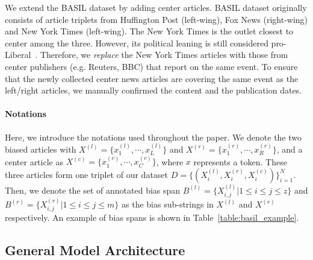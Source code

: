 \documentclass[11pt,a4paper]{article}
\begin{document}
We extend the BASIL dataset by adding center articles.
BASIL dataset originally consists of article triplets from Huffington Post (left-wing), Fox News (right-wing) and New York Times (left-wing). 
The New York Times is the outlet closest to center among the three. However, its political leaning is still considered pro-Liberal~\cite{puglisi2011being, chiang2011media}. Therefore, we \textit{replace} the New York Times articles with those from center publishers (e.g. Reuters, BBC) that report on the same event. To ensure that the newly collected center news articles are covering the same event as the left/right articles, we manually confirmed the content and the publication dates.

\paragraph{Notations} Here, we introduce the notations used throughout the paper. We denote the two biased articles with $X^{(l)}=\{x^{(l)}_1, \cdots, x^{(l)}_L\}$ and $X^{(r)}=\{x^{(r)}_1, \cdots, x^{(r)}_R\}$, and a center article as $X^{(c)}=\{x^{(c)}_1, \cdots, x^{(c)}_C\}$, where $x$ represents a token. These three articles form one triplet of our dataset $D=\{(X_i^{(l)},X_i^{(r)},X_i^{(c)})\}_{i=1}^{N}$.
Then, we denote the set of annotated bias span $B^{(l)}=\{ X^{(l)}_{i,j}|1\leq i\leq j \leq z\}$ and $B^{(r)}=\{X^{(r)}_{i,j}|1\leq i\leq j \leq m\}$ as the bias sub-strings in $X^{(l)}$ and $X^{(r)}$ respectively. An example of bias spans is shown in Table~\ref{table:basil_example}.

\subsection{General Model Architecture}
\end{document}
